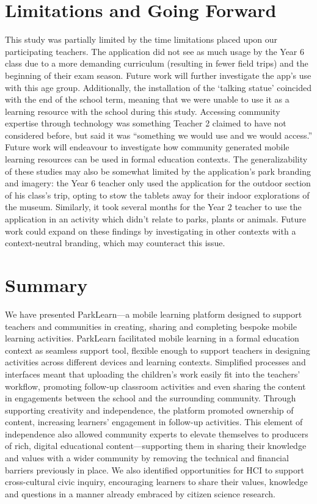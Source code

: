 \section{Limitations and Going Forward}

This study was partially limited by the time limitations placed upon our participating teachers. The application did not see as much usage by the Year 6 class due to a more demanding curriculum (resulting in fewer field trips) and the beginning of their exam season. Future work will further investigate the app’s use with this age group. Additionally, the installation of the ‘talking statue’ coincided with the end of the school term, meaning that we were unable to use it as a learning resource with the school during this study. Accessing community expertise through technology was something Teacher 2 claimed to have not considered before, but said it was “something we would use and we would access.” Future work will endeavour to investigate how community generated mobile learning resources can be used in formal education contexts. The generalizability of these studies may also be somewhat limited by the application’s park branding and imagery: the Year 6 teacher only used the application for the outdoor section of his class’s trip, opting to stow the tablets away for their indoor explorations of the museum. Similarly, it took several months for the Year 2 teacher to use the application in an activity which didn’t relate to parks, plants or animals. Future work could expand on these findings by investigating in other contexts with a context-neutral branding, which may counteract this issue.

\section{Summary}
We have presented ParkLearn—a mobile learning platform designed to support teachers and communities in creating, sharing and completing bespoke mobile learning activities. ParkLearn facilitated mobile learning in a formal education context as seamless support tool, flexible enough to support teachers in designing activities across different devices and learning contexts. Simplified processes and interfaces meant that uploading the children’s work easily fit into the teachers’ workflow, promoting follow-up classroom activities and even sharing the content in engagements between the school and the surrounding community. Through supporting creativity and independence, the platform promoted ownership of content, increasing learners’ engagement in follow-up activities. This element of independence also allowed community experts to elevate themselves to producers of rich, digital educational content—supporting them in sharing their knowledge and values with a wider community by removing the technical and financial barriers previously in place. We also identified opportunities for HCI to support cross-cultural civic inquiry, encouraging learners to share their values, knowledge and questions in a manner already embraced by citizen science research.

